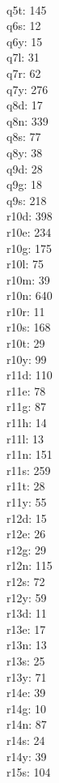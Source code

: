 \begin{multicols}{8}
  \\ q5t: 145
  \\ q6s: 12
  \\ q6y: 15
  \\ q7l: 31
  \\ q7r: 62
  \\ q7y: 276
  \\ q8d: 17
  \\ q8n: 339
  \\ q8s: 77
  \\ q8y: 38
  \\ q9d: 28
  \\ q9g: 18
  \\ q9s: 218
  \\ r10d: 398
  \\ r10e: 234
  \\ r10g: 175
  \\ r10l: 75
  \\ r10m: 39
  \\ r10n: 640
  \\ r10r: 11
  \\ r10s: 168
  \\ r10t: 29
  \\ r10y: 99
  \\ r11d: 110
  \\ r11e: 78
  \\ r11g: 87
  \\ r11h: 14
  \\ r11l: 13
  \\ r11n: 151
  \\ r11s: 259
  \\ r11t: 28
  \\ r11y: 55
  \\ r12d: 15
  \\ r12e: 26
  \\ r12g: 29
  \\ r12n: 115
  \\ r12s: 72
  \\ r12y: 59
  \\ r13d: 11
  \\ r13e: 17
  \\ r13n: 13
  \\ r13s: 25
  \\ r13y: 71
  \\ r14e: 39
  \\ r14g: 10
  \\ r14n: 87
  \\ r14s: 24
  \\ r14y: 39
  \\ r15s: 104

\end{multicols}
